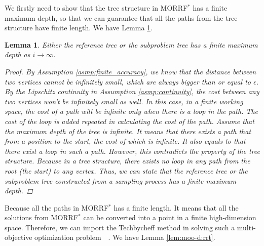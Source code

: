 \documentclass[conference]{IEEEtran}
\newtheorem{lem}{Lemma}
\begin{document}
We firstly need to show that the tree structure in MORRF$^{*}$ has a finite maximum depth,
so that we can guarantee that all the paths from the tree structure have finite length.
We have Lemma \ref{lem:tree:finite_depth}.

\begin{lem}
\label{lem:tree:finite_depth}
Either the reference tree or the subproblem tree has a finite maximum depth as $ i \rightarrow \infty $.
\begin{proof}
By Assumption \ref{asmp:finite_accuracy}, we know that the distance between two vertices cannot be infinitely small, which are always bigger than or equal to $ \epsilon $.
By the Lipschitz continuity in Assumption \ref{asmp:continuity}, the cost between any two vertices won't be infinitely small as well.
In this case, in a finite working space, the cost of a path will be infinite only when there is a loop in the path.
The cost of the loop is added repeated in calculating the cost of the path.
Assume that the maximum depth of the tree is infinite.
It means that there exists a path that from a position to the start, the cost of which is infinite.
It also equals to that there exist a loop in such a path.
However, this contradicts the property of the tree structure. 
Because in a tree structure, there exists no loop in any path from the root (the start) to any vertex.
Thus, we can state that the reference tree or the subproblem tree constructed from a sampling process has a finite maximum depth.
\end{proof}
\end{lem}

Because all the paths in MORRF$^{*}$ has a finite length.
It means that all the solutions from MORRF$^{*}$ can be converted into a point in a finite high-dimension space.
Therefore, we can import the Techbycheff method in solving such a multi-objective optimization problem~\cite{4358754}~\cite{miettinen1999nonlinear}.
We have Lemma \ref{lem:moo-d:rrt}.
\end{document}

